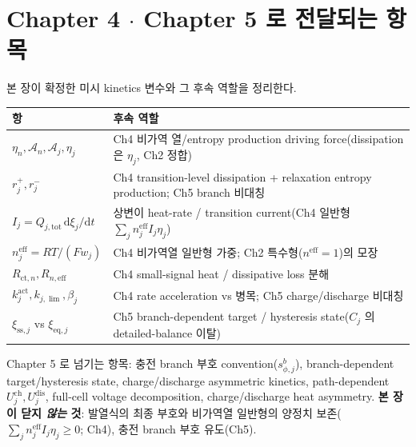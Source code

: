 \documentclass[11pt,a4paper]{article}
\newcommand{\dd}{\mathrm{d}}
\newcommand{\eff}{\mathrm{eff}}
\newcommand{\eq}{\mathrm{eq}}
\newcommand{\tot}{\mathrm{tot}}
\newcommand{\ct}{\mathrm{ct}}
\newcommand{\sstat}{\mathrm{ss}}
\begin{document}
\section{Chapter 4 $\cdot$ Chapter 5 로 전달되는 항목}\label{sec:ch3_transmit}
본 장이 확정한 미시 kinetics 변수와 그 후속 역할을 정리한다.
\begin{longtable}{p{} >{\raggedright\arraybackslash}p{}}
\toprule 항 & 후속 역할 \\ \midrule \endhead
$\eta_n,\mathcal A_n,\mathcal A_j,\eta_j$ & Ch4 비가역 열/entropy production driving force(dissipation 은 $\eta_j$, Ch2 정합) \\
$r_j^+,r_j^-$ & Ch4 transition-level dissipation + relaxation entropy production; Ch5 branch 비대칭 \\
$I_j=Q_{j,\tot}\,\dd\xi_j/\dd t$ & 상변이 heat-rate / transition current(Ch4 일반형 $\sum_j n_j^\eff I_j\eta_j$) \\
$n_j^{\eff}=RT/(Fw_j)$ & Ch4 비가역열 일반형 가중; Ch2 특수형($n^\eff=1$)의 모장 \\
$R_{\ct,n},R_{n,\eff}$ & Ch4 small-signal heat / dissipative loss 분해 \\
$k_j^{\mathrm{act}},k_{j,\lim},\beta_j$ & Ch4 rate acceleration vs 병목; Ch5 charge/discharge 비대칭 \\
$\xi_{\sstat,j}$ vs $\xi_{\eq,j}$ & Ch5 branch-dependent target / hysteresis state($C_j$ 의 detailed-balance 이탈) \\
\bottomrule
\end{longtable}
Chapter 5 로 넘기는 항목: 충전 branch 부호 convention($s_{\phi,j}^b$), branch-dependent target/hysteresis
state, charge/discharge asymmetric kinetics, path-dependent $U_j^{\mathrm{ch}},U_j^{\mathrm{dis}}$, full-cell
voltage decomposition, charge/discharge heat asymmetry. \textbf{본 장이 닫지 \emph{않는} 것}: 발열식의 최종
부호와 비가역열 일반형의 양정치 보존($\sum_j n_j^\eff I_j\eta_j\ge0$; Ch4), 충전 branch 부호 유도(Ch5).

\end{document}
